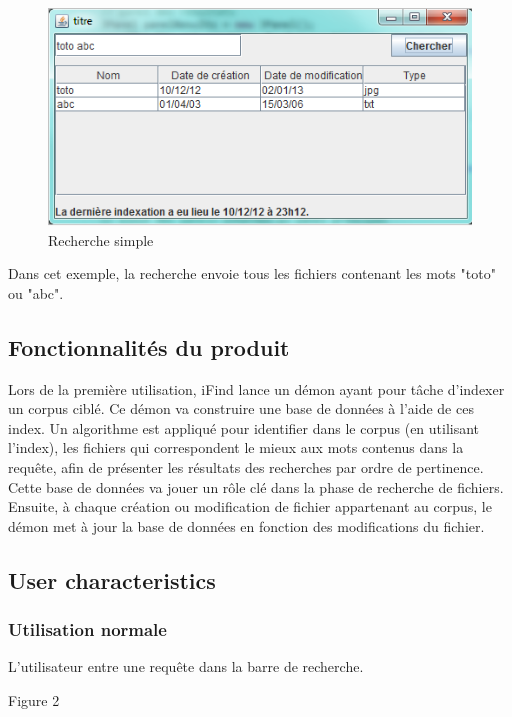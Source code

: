\documentclass[a4paper,10pt]{report}
\begin{document}
\begin{figure}
\includegraphics[scale=0.5]{figure1.png}
\caption{Recherche simple}
\end{figure}

Dans cet exemple, la recherche envoie tous les fichiers contenant les mots
"toto" ou "abc".

\subsection{Fonctionnalités du produit}
Lors de la première utilisation, iFind lance un démon ayant pour tâche d’indexer
un corpus ciblé. 
Ce démon va construire une base de données à l’aide de ces index. Un algorithme
est appliqué pour identifier dans le corpus (en utilisant l'index), les fichiers
qui correspondent le mieux aux mots contenus dans la requête, afin de présenter
les résultats des recherches par ordre de pertinence. Cette base de données va
jouer un rôle clé dans la phase de recherche de fichiers.
Ensuite, à chaque création ou modification de fichier appartenant au corpus, le
démon met à jour la base de données en fonction des modifications du fichier.

\subsection{User characteristics}



\subsubsection{Utilisation normale}
L'utilisateur entre une requête dans la barre de recherche.

Figure 2
\end{document}
